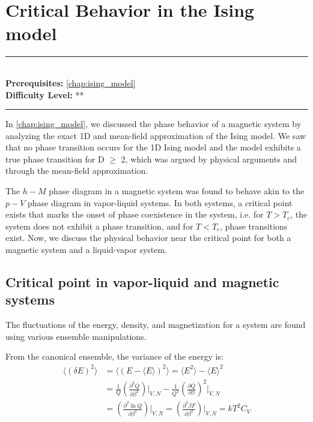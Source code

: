 \documentclass[book.tex]{subfiles}
\begin{document}
\chapter{Critical Behavior in the Ising model}
\label{chap:ising_critical}
\noindent\rule{11cm}{0.4pt} \\
\textbf{Prerequisites:} \autoref{chap:ising_model}  \\
\textbf{Difficulty Level:} ** \\
\noindent\rule{11cm}{0.4pt}
\vspace{5mm}

In \autoref{chap:ising_model}, we discussed the phase behavior of a magnetic system by analyzing the exact 1D and mean-field approximation of the Ising model. We saw that no phase transition occurs for the 1D Ising model and the model exhibits a true phase transition for D $\geq$ 2, which was argued by physical arguments and through the mean-field approximation.

The $h-M$ phase diagram in a magnetic system was found to behave akin to the $p-V$ phase diagram in vapor-liquid systems. In both systems, a critical point exists that marks the onset of phase coexistence in the system, i.e. for $T > T_c$, the system does not exhibit a phase transition, and for $T < T_c$, phase transitions exist. Now, we discuss the physical behavior near the critical point for both a magnetic system and a liquid-vapor system.

\section{Critical point in vapor-liquid and magnetic systems}

The fluctuations of the energy, density, and magnetization for a system are found using various ensemble manipulations. 

From the canonical ensemble, the variance of the energy is:
\begin{align}\label{Eq1}
\langle (\delta E)^2\rangle &= \langle (E - \langle E \rangle)^2\rangle =  \langle E^{2} \rangle - \langle E \rangle^{2} \\
&= \frac{1}{Q}\left(\frac{\partial ^{2}Q}{\partial \beta^{2}}\right)\bigg|_{V,N} - \frac{1}{Q^{2}}\left(\frac{\partial Q}{\partial \beta}\right)^{2}\bigg|_{V,N}  \\
 &= \left(\frac{\partial ^{2}\ln Q}{\partial \beta^{2}}\right)\bigg|_{V,N} = \left(\frac{\partial ^{2}\beta F}{\partial \beta^{2}}\right)\bigg|_{V,N} = kT^{2}C_{V}
\end{align}
\end{document}
